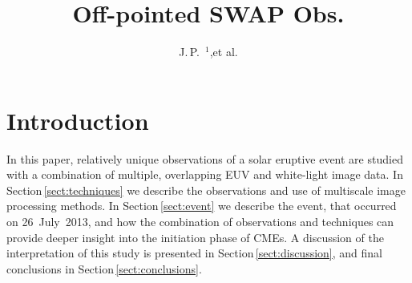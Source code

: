 \documentclass[namedreferences]{solarphysics}
\begin{document}
\begin{article}

\begin{opening}

\title{Off-pointed SWAP Obs.}

%
\author{J.\,P.~$^{1}$\sep et al.
       }

%


%


\begin{abstract}

 
\end{abstract}



%


\end{opening}

%

\section{Introduction}
\label{intro}



In this paper, relatively unique observations of a solar eruptive event are studied with a combination of multiple, overlapping EUV and white-light image data. In Section\,\ref{sect:techniques} we describe the observations and use of multiscale image processing methods. In Section\,\ref{sect:event} we describe the event, that occurred on 26~July~2013, and how the combination of observations and techniques can provide deeper insight into the initiation phase of CMEs. A discussion of the interpretation of this study is presented in Section\,\ref{sect:discussion}, and final conclusions in Section\,\ref{sect:conclusions}.


\end{article}
\end{document}
